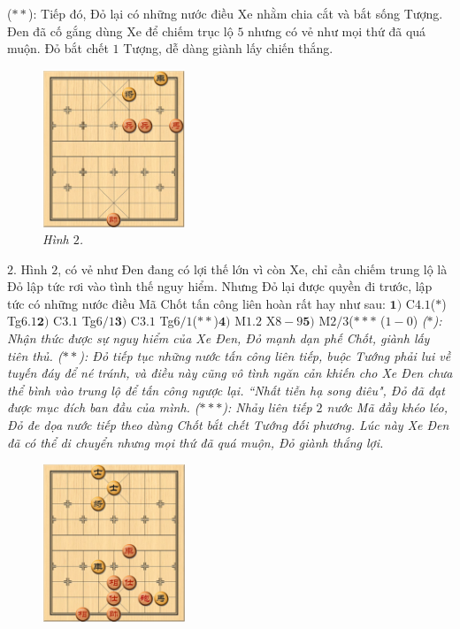 \begin{multicols}{2}
{	\vskip 0.1cm
	($**$): Tiếp đó, Đỏ lại có những nước điều Xe nhằm chia cắt và bắt sống Tượng. Đen đã cố gắng dùng Xe để chiếm trục lộ $5$ nhưng có vẻ như mọi thứ đã quá muộn. Đỏ bắt chết $1$ Tượng, dễ dàng giành lấy chiến thắng.}
	\begin{figure}[H]
		\vspace*{-5pt}
		\centering
		\captionsetup{labelformat= empty, justification=centering}
		\includegraphics[width= 0.38\textwidth]{3}
		\caption{\small\textit{\color{gocco}Hình $2$.}}
		\vspace*{-10pt}
	\end{figure}
	$2.$ Hình $2$, có vẻ như Đen đang có lợi thế lớn vì còn Xe, chỉ cần chiếm trung lộ là Đỏ lập tức rơi vào tình thế nguy hiểm. Nhưng Đỏ lại được quyền đi trước, lập tức có những nước điều Mã Chốt tấn công liên hoàn rất hay như sau:
	\vskip 0.1cm
	$\pmb{1)}$ C$4.1$($*$) Tg$6.1$\quad $\pmb{2)}$ C$3.1$ Tg$6/1$\quad $\pmb{3)}$ C$3.1$ Tg$6/1$($**$)\quad $\pmb{4)}$ M$1.2$ X$8-9$\quad $\pmb{5)}$ M$2/3$($***$ ($1-0$)
	\vskip 0.1cm
	\textit{($*$): Nhận thức được sự nguy hiểm của Xe Đen, Đỏ mạnh dạn phế Chốt, giành lấy tiên thủ.
	\vskip 0.1cm 
	($**$): Đỏ tiếp tục những nước tấn công liên tiếp, buộc Tướng phải lui về tuyến đáy để né tránh, và điều này cũng vô tình ngăn cản khiến cho Xe Đen chưa thể bình vào trung lộ để tấn công ngược lại. ``Nhất tiễn hạ song điêu", Đỏ đã đạt được mục đích ban đầu của mình.
	\vskip 0.1cm
	($***$): Nhảy liên tiếp $2$ nước Mã đầy khéo léo, Đỏ đe dọa nước tiếp theo dùng Chốt bắt chết Tướng đối phương. Lúc này Xe Đen đã có thể di chuyển nhưng mọi thứ đã quá muộn, Đỏ giành thắng lợi.}
	\begin{figure}[H]
		\vspace*{-5pt}
		\centering
		\captionsetup{labelformat= empty, justification=centering}
		\includegraphics[width= 0.38\textwidth]{2}

\end{figure}
\end{multicols}

